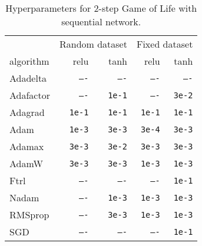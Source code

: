 \documentclass[letterpaper]{article} %
\begin{document}
\begin{table}[h]
    \centering\small
    \begin{tabular}{lrrrr}
        \toprule
        & \multicolumn{2}{c}{Random dataset} & \multicolumn{2}{c}{Fixed dataset}
        \\\cmidrule(lr){2-3}\cmidrule(lr){4-5}
        algorithm & relu & tanh & relu & tanh
        \\\midrule
        Adadelta & \texttt{----} & \texttt{----} & \texttt{----} & \texttt{----}
        \\
        Adafactor & \texttt{----} & \texttt{1e-1} & \texttt{----} & \texttt{3e-2}
        \\
        Adagrad & \texttt{1e-1} & \texttt{1e-1} & \texttt{1e-1} & \texttt{1e-1}
        \\
        Adam & \texttt{1e-3} & \texttt{3e-3} & \texttt{3e-4} & \texttt{3e-3}
        \\
        Adamax & \texttt{3e-3} & \texttt{3e-2} & \texttt{3e-3} & \texttt{3e-3}
        \\
        AdamW & \texttt{3e-3} & \texttt{3e-3} & \texttt{1e-3} & \texttt{1e-3}
        \\
        Ftrl & \texttt{----} & \texttt{----} & \texttt{----} & \texttt{1e-1}
        \\
        Nadam & \texttt{----} & \texttt{1e-3} & \texttt{1e-3} & \texttt{1e-3}
        \\
        RMSprop & \texttt{----} & \texttt{3e-3} & \texttt{1e-3} & \texttt{1e-3}
        \\
        SGD & \texttt{----} & \texttt{----} & \texttt{----} & \texttt{1e-1}
        \\\bottomrule
    \end{tabular}
    \caption{Hyperparameters for 2-step Game of Life with sequential network.}
    \label{tab:search_2_step_seq}
\end{table}
\end{document}
